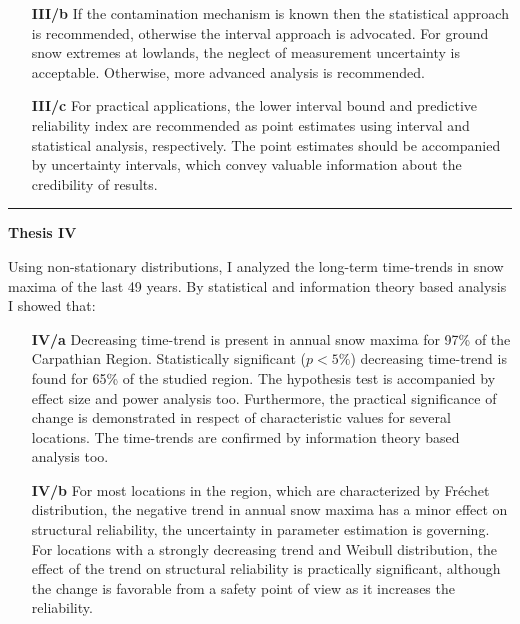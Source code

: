 \begin{enumerate}[leftmargin=*, align=left]
\begin{enumerate}[leftmargin=*, align=left]
      \item[\textbf{III/b}] If the contamination mechanism is known then the statistical approach is recommended, otherwise the interval approach is advocated. For ground snow extremes at lowlands, the neglect of measurement uncertainty is acceptable. Otherwise, more advanced analysis is recommended.
      
     \item[\textbf{III/c}] For practical applications, the lower interval bound and predictive reliability index are recommended as point estimates using interval and statistical analysis, respectively. The point estimates should be accompanied by uncertainty intervals, which convey valuable information about the credibility of results.
    \end{enumerate}
  
    
  \citep{RozsasREC2016snow}
  
  \begin{center}
    \noindent\rule[0.5ex]{0.5\linewidth}{0.5pt}
    \item[\textbf{Thesis IV}] \hfill
  \end{center}
  Using non-stationary distributions, I analyzed the long-term time-trends in snow maxima of the last 49 years. By statistical and information theory based analysis I showed that:
  \begin{enumerate}[leftmargin=*, align=left]
    \item[\textbf{IV/a}] Decreasing time-trend is present in annual snow maxima for 97\% of the Carpathian Region. Statistically significant ($p<5\%$) decreasing time-trend is found for 65\% of the studied region. The hypothesis test is accompanied by effect size and power analysis too. Furthermore, the practical significance of change is demonstrated in respect of characteristic values for several locations. The time-trends are confirmed by information theory based analysis too.
  
    \item[\textbf{IV/b}] For most locations in the region, which are characterized by Fréchet distribution, the negative trend in annual snow maxima has a minor effect on structural reliability, the uncertainty in parameter estimation is governing. For locations with a strongly decreasing trend and Weibull distribution, the effect of the trend on structural reliability is practically significant, although the change is favorable from a safety point of view as it increases the reliability.
  \end{enumerate}
  

\end{enumerate}
